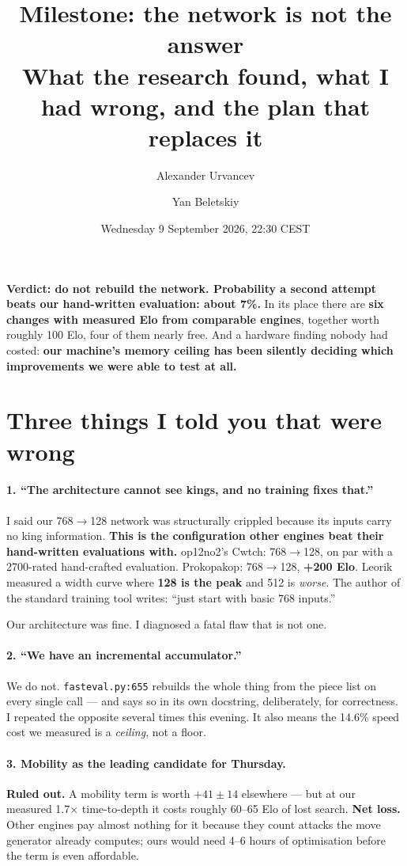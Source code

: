 \documentclass[11pt,a4paper]{article}
\title{\textbf{Milestone: the network is not the answer}\\[0.35em]
\large What the research found, what I had wrong, and the plan that replaces it}
\author{Alexander Urvancev \and Yan Beletskiy}
\date{Wednesday 9 September 2026, 22:30 CEST}
\newcommand{\good}[1]{\textcolor{teal!70!black}{\textbf{#1}}}
\newcommand{\bad}[1]{\textcolor{red!65!black}{\textbf{#1}}}
\begin{document}
\maketitle

\begin{keybox}
\textbf{Verdict: do not rebuild the network. Probability a second attempt beats our hand-written
evaluation: about 7\%.} In its place there are \textbf{six changes with measured Elo from
comparable engines}, together worth roughly 100 Elo, four of them nearly free. And a hardware
finding nobody had costed: \textbf{our machine's memory ceiling has been silently deciding which
improvements we were able to test at all.}
\end{keybox}

\section{Three things I told you that were wrong}

\paragraph{1. ``The architecture cannot see kings, and no training fixes that.''}
I said our 768$\rightarrow$128 network was structurally crippled because its inputs carry no king
information. \textbf{This is the configuration other engines beat their hand-written evaluations
with.} op12no2's Cwtch: 768$\rightarrow$128, on par with a 2700-rated hand-crafted evaluation.
Prokopakop: 768$\rightarrow$128, \good{+200 Elo}. Leorik measured a width curve where \textbf{128
is the peak} and 512 is \emph{worse}. The author of the standard training tool writes: ``just
start with basic 768 inputs.''

Our architecture was fine. I diagnosed a fatal flaw that is not one.

\paragraph{2. ``We have an incremental accumulator.''}
We do not. \texttt{fasteval.py:655} rebuilds the whole thing from the piece list on every single
call --- and says so in its own docstring, deliberately, for correctness. I repeated the opposite
several times this evening. It also means the 14.6\% speed cost we measured is a \emph{ceiling},
not a floor.

\paragraph{3. Mobility as the leading candidate for Thursday.}
\bad{Ruled out.} A mobility term is worth $+41 \pm 14$ elsewhere --- but at our measured
1.7$\times$ time-to-depth it costs roughly 60--65 Elo of lost search. \textbf{Net loss.} Other
engines pay almost nothing for it because they count attacks the move generator already
computes; ours would need 4--6 hours of optimisation before the term is even affordable.
\end{document}
